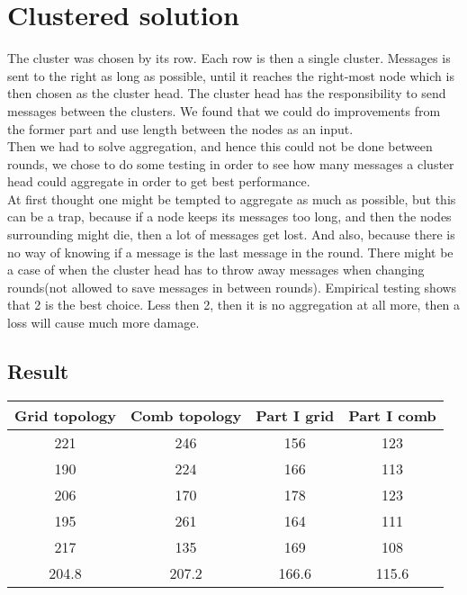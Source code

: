 \documentclass{article}
\begin{document}
  \section{Clustered solution}
   The cluster was chosen by its row. Each row is then a single cluster. Messages
   is sent to the right as long as possible, until it reaches the right-most
   node which is then chosen as the cluster head. The cluster head has the
   responsibility to send messages between the clusters. We found that
   we could do improvements from the former part and use length between the
   nodes as an input.\\
   Then we had to solve aggregation, and hence this could not be done between
   rounds, we chose to do some testing in order to see how many messages a cluster
   head could aggregate in order to get best performance.\\
   At first thought one might be tempted to aggregate as much as possible, but
   this can be a trap, because if a node keeps its messages too long, and then
   the nodes surrounding might die, then a lot of messages get lost. And also, because
   there is no way of knowing if a message is the last message in the round. There might be
   a case of when the cluster head has to throw away messages when changing
   rounds(not allowed to save messages in between rounds). Empirical testing
   shows that 2 is the best choice. Less then 2, then it is no aggregation at all
   more, then a loss will cause much more damage. 

  \subsection{Result}
    \begin{tabular}{c|c||c|c}
      Grid topology & Comb topology & Part I grid & Part I comb\\
      \hline
      \hline
      221 &246  &156 & 123 \\
      190 &224  &166 & 113 \\
      206 &170  &178 & 123 \\
      195 &261  &164 & 111 \\
      217 &135  &169 & 108 \\
      \hline
      204.8&207.2&166.6&115.6\\
    \end{tabular}
\end{document}
